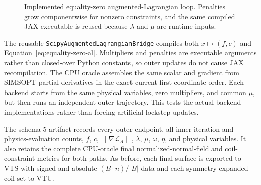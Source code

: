 \documentclass[11pt,a4paper]{article}
\newcommand{\code}[1]{\texttt{#1}}
\begin{document}
\begin{figure}[htbp]
\centering
{}
\caption{Implemented equality-zero augmented-Lagrangian loop.  Penalties grow
componentwise for nonzero constraints, and the same compiled JAX executable is
reused because $\lambda$ and $\mu$ are runtime inputs.}
\label{fig:equality-al-loop}
\end{figure}

The reusable \code{ScipyAugmentedLagrangianBridge} compiles both
$x\mapsto(f,c)$ and Equation~\eqref{eq:equality-zero-al}.  Multipliers and
penalties are executable arguments rather than closed-over Python constants,
so outer updates do not cause JAX recompilation.  The CPU oracle assembles the
same scalar and gradient from SIMSOPT partial derivatives in the exact
current-first coordinate order.  Each backend starts from the same physical
variables, zero multipliers, and common $\mu$, but then runs an independent
outer trajectory.  This tests the actual backend implementations rather than
forcing artificial lockstep updates.

The schema-5 artifact records every outer endpoint, all inner iteration and
physics-evaluation counts, $f$, $c$, $\lVert\nabla\mathcal L_A\rVert$,
$\lambda$, $\mu$, $\omega$, $\eta$, and physical variables.  It also retains
the complete CPU-oracle final normalized-normal-field and coil-constraint
metrics for both paths.  As before, each final surface is exported to VTS with
signed and absolute $(B\cdot n)/|B|$ data and each symmetry-expanded coil set
to VTU.
\end{document}
